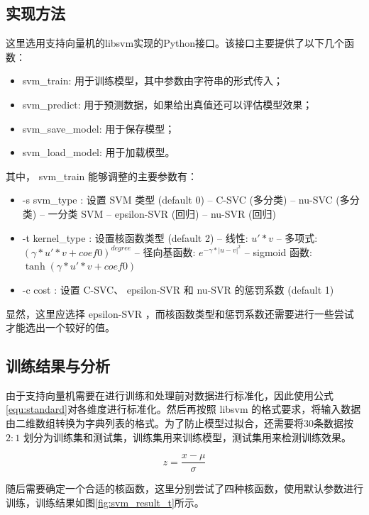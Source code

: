 \documentclass[a4paper, 12pt]{article}
\begin{document}
		\subsection{实现方法}
			这里选用支持向量机的libsvm实现的Python接口。该接口主要提供了以下几个函数：
			\begin{itemize}
				\item svm\_train: 用于训练模型，其中参数由字符串的形式传入；
				\item svm\_predict: 用于预测数据，如果给出真值还可以评估模型效果；
				\item svm\_save\_model: 用于保存模型；
				\item svm\_load\_model: 用于加载模型。
			\end{itemize}
			其中， svm\_train 能够调整的主要参数有：
			\begin{itemize}\setlength{\itemsep}{0pt}
				\item -s svm\_type : 设置 SVM 类型 (default 0)
				 -- C-SVC		(多分类)
				 -- nu-SVC	(多分类)
				 -- 一分类 SVM
				 -- epsilon-SVR	(回归)
				 -- nu-SVR		(回归)
				\item -t kernel\_type : 设置核函数类型 (default 2)
				 -- 线性: $u'*v$
				 -- 多项式: $(\gamma * u' * v + coef0)^{degree}$
				 -- 径向基函数: $e^{-\gamma * \left|u-v\right|^2}$
				 -- sigmoid 函数: $\tanh(\gamma * u' * v+coef0)$
				\item -c cost : 设置 C-SVC、 epsilon-SVR 和 nu-SVR 的惩罚系数 (default 1)
			\end{itemize}

			显然，这里应选择 epsilon-SVR ，而核函数类型和惩罚系数还需要进行一些尝试才能选出一个较好的值。
			
		\subsection{训练结果与分析}
			由于支持向量机需要在进行训练和处理前对数据进行标准化，因此使用公式\eqref{equ:standard}对各维度进行标准化。然后再按照 libsvm 的格式要求，将输入数据由二维数组转换为字典列表的格式。为了防止模型过拟合，还需要将30条数据按 $2:1$ 划分为训练集和测试集，训练集用来训练模型，测试集用来检测训练效果。
			
			\begin{equation}\label{equ:standard}
				z = \frac{x - \mu}{\sigma}
			\end{equation}
			
			随后需要确定一个合适的核函数，这里分别尝试了四种核函数，使用默认参数进行训练，训练结果如图\ref{fig:svm_result_t}所示。
			
\end{document}
